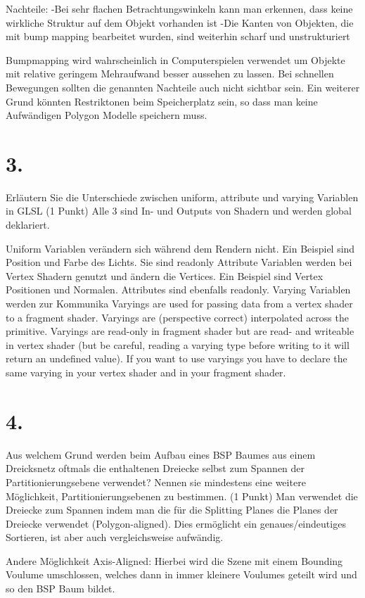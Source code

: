 \documentclass[12pt]{scrreprt}
\begin{document}
Nachteile:
-Bei sehr flachen Betrachtungswinkeln kann man erkennen, dass keine wirkliche Struktur auf dem Objekt vorhanden ist
-Die Kanten von Objekten, die mit bump mapping bearbeitet wurden, sind weiterhin scharf und unstrukturiert

Bumpmapping wird wahrscheinlich in Computerspielen verwendet um Objekte mit relative geringem Mehraufwand besser aussehen zu lassen. Bei schnellen Bewegungen sollten die genannten Nachteile auch nicht sichtbar sein. Ein weiterer Grund könnten Restriktonen beim Speicherplatz sein, so dass man keine Aufwändigen Polygon Modelle speichern muss.

\section*{3.}
Erläutern Sie die Unterschiede zwischen uniform, attribute und varying Variablen in GLSL (1 Punkt)
Alle 3 sind In- und Outputs von Shadern und werden global deklariert.

Uniform Variablen verändern sich während dem Rendern nicht. Ein Beispiel sind Position und Farbe des Lichts. Sie sind readonly
Attribute Variablen werden bei Vertex Shadern genutzt und ändern die Vertices. Ein Beispiel sind Vertex Positionen und Normalen. Attributes sind ebenfalls readonly.
Varying Variablen werden zur Kommunika
Varyings are used for passing data from a vertex shader to a fragment shader. Varyings are (perspective correct) interpolated across the primitive. Varyings are read-only in fragment shader but are read- and writeable in vertex shader (but be careful, reading a varying type before writing to it will return an undefined value). If you want to use varyings you have to declare the same varying in your vertex shader and in your fragment shader.

\section*{4.}
Aus welchem Grund werden beim Aufbau eines BSP Baumes aus einem Dreicksnetz oftmals die enthaltenen Dreiecke selbst zum Spannen der Partitionierungsebene verwendet? Nennen sie mindestens eine weitere Möglichkeit, Partitionierungsebenen zu bestimmen. (1 Punkt)
Man verwendet die Dreiecke zum Spannen indem man die für die Splitting Planes die Planes der Dreiecke verwendet (Polygon-aligned). Dies ermöglicht ein genaues/eindeutiges Sortieren, ist aber auch vergleichsweise aufwändig.

Andere Möglichkeit Axis-Aligned: Hierbei wird die Szene mit einem Bounding Voulume umschlossen, welches dann in immer kleinere Voulumes geteilt wird und so den BSP Baum bildet.
\end{document}
